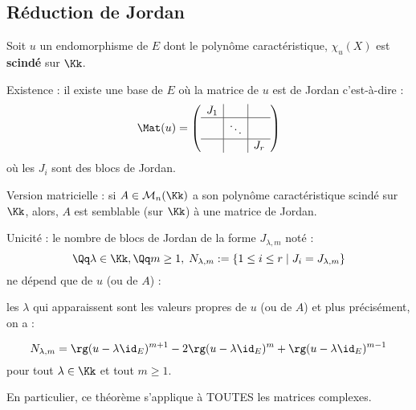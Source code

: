 \documentclass[class=report,crop=false]{standalone}
\begin{document}
\subsection{Réduction de Jordan}

\begin{theoreme}
Soit $u$ un endomorphisme de $E$ dont le polynôme caractéristique,  $\chi_u(X)$ est {\bf scindé} sur $\Kk$.

Existence : il existe une base de $E$ où la matrice de $u$ est de Jordan c'est-à-dire  :
\[ \Mat (u) = \left(\begin{array}{c|c|c}
J_1&&\\\hline
&\ddots&\\\hline
&&J_r
\end{array}\right)\]
où les $J_i$ sont des blocs de Jordan.

Version matricielle  : si $A \in \mathcal{M}_n(\Kk)$ a son polynôme caractéristique scindé sur $\Kk$, alors, $A$ est semblable (sur $\Kk$) à une matrice de Jordan.

Unicité : le nombre de blocs de Jordan de la forme $J_{\lambda,m}$ noté :
\[ \Qq \lambda \in \Kk, \Qq m \ge 1 ,\; N_{\lambda,m} := \{1 \le i \le r \mid J_i = J_{\lambda,m} \} \]
ne dépend que de $u$ (ou de $A$) :

les $\lambda$ qui apparaissent sont les valeurs propres de $u$ (ou de $A$) et plus précisément, on a :

\[N_{\lambda,m} = \rg(u-\lambda\id_E)^{m+1}-2\rg(u-\lambda\id_E)^m+\rg(u-\lambda\id_E)^{m-1}\]
pour tout $\lambda \in \Kk$ et tout $m \ge 1$.

 
\end{theoreme}

\begin{remarque*}
En particulier, ce théorème s'applique à TOUTES les matrices complexes.
\end{remarque*}
\end{document}
